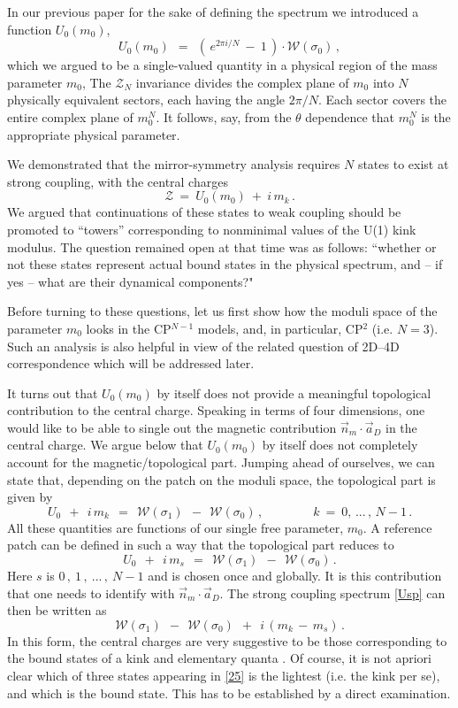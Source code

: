 \documentclass[epsfig,12pt]{article}
\def\beq{\begin{equation}}
\def\eeq{\end{equation}}
\def\beq{\begin{equation}}
\def\eeq{\end{equation}}
\newcommand{\mc}[1]{\mathcal{#1}}
\begin{document}
	In our previous paper \cite{Bolokhov:2011mp} for the sake of defining the spectrum we introduced a function $ U_0(m_0) $,
\beq
	U_0 (m_0) ~~=~~ \left(\, e^{2 \pi i / N} ~-~ 1 \,\right) \cdot \mc{W}(\sigma_0)\,,
\eeq
	which we argued to be a single-valued quantity in a physical region of the mass parameter $ m_0 $,
	The $\mc{Z}_N$ invariance divides the complex plane of $ m_0 $ into $ N $ physically equivalent  sectors,
	each having the angle $2\pi/N$. Each sector covers the entire complex plane of
	$m_0^N$. It follows, say, from the $\theta$ dependence that $m_0^N$ is the appropriate physical parameter.
	
	We demonstrated that the mirror-symmetry analysis requires $ N $ states to exist at strong coupling,
	with  the 
	central charges
\beq
\label{Usp}
	\mc{Z} ~=~ U_0(m_0) ~+~ i\,m_k\,.
\eeq
	We argued that continuations of these states to  weak coupling should be promoted to ``towers''
	corresponding to nonminimal values of the U(1) kink modulus.
	The question remained open at that time was as follows: ``whether or not these states represent
	actual bound states in the physical spectrum, and -- if yes -- what are their dynamical components?"

	Before turning to these questions,  let us first show how the moduli space of the parameter
	$ m_0 $ looks   in the CP$^{N-1}$ models, and, in particular, CP$^2$ (i.e. $N=3$). 
	Such an analysis is also helpful in view of the related question of 2D--4D correspondence
	which will be addressed later.
	
	It turns out that $ U_0(m_0) $ by itself does not  provide a meaningful topological contribution
	to the central charge.
	Speaking in terms of four dimensions, one would like to be able to single out 
	the magnetic contribution $ \vec{n}{}_m \cdot \vec{a}{}_D $ in the central charge.
	We argue below  that $ U_0(m_0) $ by itself does not completely account for the 
	magnetic/topological part.
	Jumping ahead of ourselves, we can state that, depending on the patch on the moduli space, 
	the topological part is given by
\beq
	U_0 ~~+~~ i\, m_k ~~=~~ \mc{W}(\sigma_1) ~~-~~ \mc{W}(\sigma_0) \,,
	\qquad\qquad k ~=~ 0,\,...\,,\, N-1\,.
\eeq
	All these quantities are functions of our single free parameter, $ m_0 $.
	A reference patch can be defined in such a way that the topological part reduces to
\beq
	U_0 ~~+~~ i\, m_s ~~=~~ \mc{W}(\sigma_1) ~~-~~ \mc{W}(\sigma_0) \,.
\eeq
	Here $ s $ is $ 0\,,~1\,,~...\,,~ N-1 $ and is chosen once and globally.
	It is this contribution that one needs to identify with $ \vec{n}{}_m \cdot \vec{a}{}_D $.
	The strong coupling spectrum \eqref{Usp} can then be written as
\beq
	\mc{W}(\sigma_1) ~~-~~ \mc{W}(\sigma_0) ~~+~~ i\, ( m_k \,-\, m_s )\,.
	\label{25}
\eeq
	In this form, the central charges are very suggestive to be those corresponding to  the bound states 
	of a kink and elementary quanta \cite{Dorey:1999zk}.
	Of course, it is not apriori clear which of three states appearing in \eqref{25} is the lightest (i.e. the kink per se), 
	and which is the bound state. 
	This has to be established by a direct examination.
	
\end{document}
